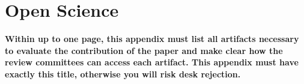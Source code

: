 \section*{Open Science}
\textbf{Within up to one page, this appendix must list all artifacts necessary to evaluate the contribution of the paper and make clear how the review committees can access each artifact. This appendix must have exactly this title, otherwise you will risk desk rejection. }
